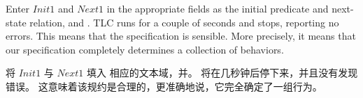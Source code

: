 \begin{en}
Enter $Init1$ and $Next1$ in the appropriate fields as the initial
predicate and next-state relation, and \@.
TLC runs for a couple of seconds and stops, reporting no errors.  This
means that the specification is sensible.  More precisely, it means
that our specification completely determines a collection of
behaviors.
\end{en}

\begin{ch}
  将\tlainitpredicate{} $Init1$ 与\tlanextstaterelation{} $Next1$ 填入
  相应的文本域，并\@。
  \tlc{}将在几秒钟后停下来，并且没有发现错误。
  这意味着该规约是合理的，更准确地说，它完全确定了一组行为。
\end{ch}

\pause

